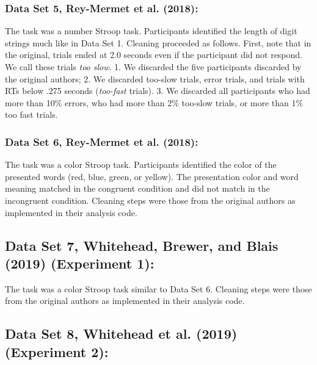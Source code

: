\documentclass[
  ,man]{apa6}
\begin{document}
\hypertarget{data-set-5-rey-mermet.etal.2018}{%
\subsubsection{Data Set 5, Rey-Mermet et al. (2018):}\label{data-set-5-rey-mermet.etal.2018}}

The task was a number Stroop task. Participants identified the length of digit strings much like in Data Set 1. Cleaning proceeded as follows. First, note that in the original, trials ended at 2.0 seconds even if the participant did not respond. We call these trials \emph{too slow}. 1. We discarded the five participants discarded by the original authors; 2. We discarded too-slow trials, error trials, and trials with RTs below .275 seconds (\emph{too-fast} trials). 3. We discarded all participants who had more than 10\% errors, who had more than 2\% too-slow trials, or more than 1\% too fast trials.

\hypertarget{data-set-6-rey-mermet.etal.2018}{%
\subsubsection{Data Set 6, Rey-Mermet et al. (2018):}\label{data-set-6-rey-mermet.etal.2018}}

The task was a color Stroop task. Participants identified the color of the presented words (red, blue, green, or yellow). The presentation color and word meaning matched in the congruent condition and did not match in the incongruent condition. Cleaning steps were those from the original authors as implemented in their analysis code.

\hypertarget{data-set-7-whitehead.etal.2019-experiment-1}{%
\subsection{Data Set 7, Whitehead, Brewer, and Blais (2019) (Experiment 1):}\label{data-set-7-whitehead.etal.2019-experiment-1}}

The task was a color Stroop task similar to Data Set 6. Cleaning steps were those from the original authors as implemented in their analysis code.

\hypertarget{data-set-8-whitehead.etal.2019-experiment-2}{%
\subsection{Data Set 8, Whitehead et al. (2019) (Experiment 2):}\label{data-set-8-whitehead.etal.2019-experiment-2}}
\end{document}
